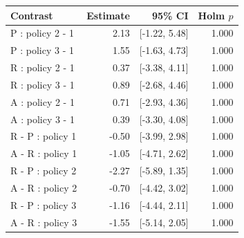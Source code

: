 \begin{tabular}{@{}p{5.7cm}rrr@{}}
\toprule
Contrast & Estimate & 95\% CI & Holm $p$ \\
\midrule
P : policy 2 - 1 & 2.13 & [-1.22, 5.48] & 1.000 \\
P : policy 3 - 1 & 1.55 & [-1.63, 4.73] & 1.000 \\
R : policy 2 - 1 & 0.37 & [-3.38, 4.11] & 1.000 \\
R : policy 3 - 1 & 0.89 & [-2.68, 4.46] & 1.000 \\
A : policy 2 - 1 & 0.71 & [-2.93, 4.36] & 1.000 \\
A : policy 3 - 1 & 0.39 & [-3.30, 4.08] & 1.000 \\
R - P : policy 1 & -0.50 & [-3.99, 2.98] & 1.000 \\
A - R : policy 1 & -1.05 & [-4.71, 2.62] & 1.000 \\
R - P : policy 2 & -2.27 & [-5.89, 1.35] & 1.000 \\
A - R : policy 2 & -0.70 & [-4.42, 3.02] & 1.000 \\
R - P : policy 3 & -1.16 & [-4.44, 2.11] & 1.000 \\
A - R : policy 3 & -1.55 & [-5.14, 2.05] & 1.000 \\
\bottomrule
\end{tabular}
